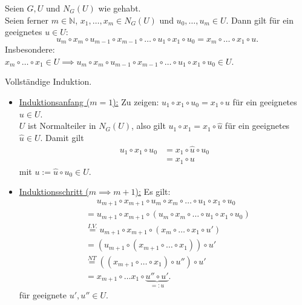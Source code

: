 \documentclass[a4paper]{article}
\newcommand{\N}{\mathbb{N}}
\begin{document}
    \begin{satz}
        Seien $G, U$ und $N_G(U)$ wie gehabt. \\
        Seien ferner $m \in \N$, $x_1, \ldots, x_m \in N_G(U)$ und $u_0, \ldots, u_m \in U$. Dann gilt für ein geeignetes $u \in U$:
        \[
            u_m \circ x_m \circ u_{m-1} \circ x_{m-1} \circ \ldots \circ u_1 \circ x_1 \circ u_0 = x_m \circ \ldots \circ  x_1 \circ u
        .\] 
        Insbesondere: \\
        $x_m \circ \ldots \circ x_1 \in U \implies u_m \circ x_m \circ u_{m-1} \circ x_{m-1} \circ \ldots \circ u_1 \circ x_1 \circ u_0 \in U$.
    \end{satz}

    \begin{beweis}
        Vollständige Induktion.
        \begin{itemize}
            \item \underline{Induktionsanfang ($m=1$):}
                Zu zeigen: $u_1 \circ x_1 \circ u_0 = x_1 \circ u$ für ein geeignetes $u \in U$. \\
                $U$ ist Normalteiler in $N_G(U)$, also gilt $u_1 \circ x_1 = x_1 \circ \hat{u}$ für ein geeignetes $\hat{u} \in U$. Damit gilt 
                \begin{align*}
                    u_1 \circ x_1 \circ u_0 &= x_1 \circ \hat{u} \circ u_0 \\
                                            &= x_1 \circ u
                \end{align*}
                mit $u := \hat{u} \circ u_0 \in U$.

            \item \underline{Induktionsschritt ($m \implies m+1$):}
                Es gilt:
                \begin{align*}
                    &\phantom{=} u_{m+1} \circ x_{m+1} \circ u_m \circ x_m \circ \ldots \circ u_1 \circ x_1 \circ u_0 \\
                    &= u_{m+1} \circ x_{m+1} \circ (u_m \circ x_m \circ \ldots \circ u_1 \circ x_1 \circ u_0) \\
                    &\overset{I.V.}{=}u_{m+1} \circ x_{m+1} \circ (x_m \circ \ldots \circ x_1 \circ u')  \\
                    &= (u_{m+1} \circ (x_{m+1} \circ \ldots \circ x_1)) \circ u' \\
                    &\overset{NT}{=} ((x_{m+1} \circ \ldots \circ x_1) \circ u'') \circ u' \\
                    &= x_{m+1} \circ \ldots x_1 \circ \underbrace{u'' \circ u'}_{=: u} 
                .\end{align*}
                für geeignete $u', u'' \in U$.
        \end{itemize}
    \end{beweis}
\end{document}
